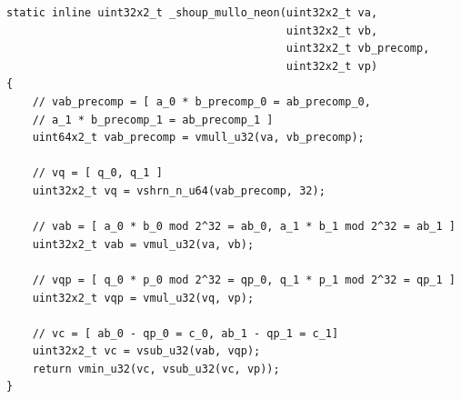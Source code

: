 \documentclass{article}
\begin{document}
\begin{lstlisting}[caption = Auxiliary Function of Shoup’s Modular Reduction (Version with multiply-low)]
static inline uint32x2_t _shoup_mullo_neon(uint32x2_t va,
                                           uint32x2_t vb,
                                           uint32x2_t vb_precomp,
                                           uint32x2_t vp)
{
    // vab_precomp = [ a_0 * b_precomp_0 = ab_precomp_0,
    // a_1 * b_precomp_1 = ab_precomp_1 ]
    uint64x2_t vab_precomp = vmull_u32(va, vb_precomp);

    // vq = [ q_0, q_1 ]
    uint32x2_t vq = vshrn_n_u64(vab_precomp, 32);

    // vab = [ a_0 * b_0 mod 2^32 = ab_0, a_1 * b_1 mod 2^32 = ab_1 ]
    uint32x2_t vab = vmul_u32(va, vb);

    // vqp = [ q_0 * p_0 mod 2^32 = qp_0, q_1 * p_1 mod 2^32 = qp_1 ]
    uint32x2_t vqp = vmul_u32(vq, vp);

    // vc = [ ab_0 - qp_0 = c_0, ab_1 - qp_1 = c_1]
    uint32x2_t vc = vsub_u32(vab, vqp);
    return vmin_u32(vc, vsub_u32(vc, vp));
}
\end{lstlisting}
\end{document}

